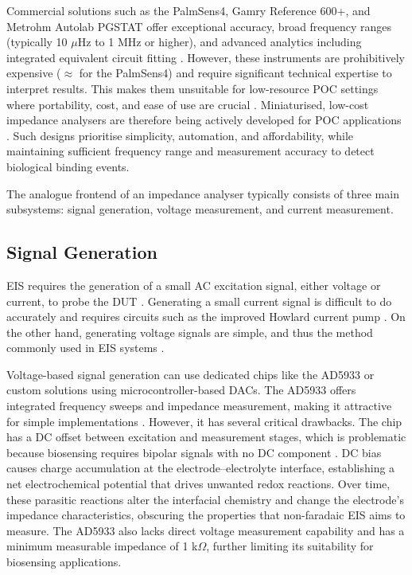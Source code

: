 Commercial solutions such as the PalmSens4, Gamry Reference 600+, and Metrohm Autolab PGSTAT offer exceptional accuracy, broad frequency ranges (typically 10 $\mu$Hz to 1 MHz or higher), and advanced analytics including integrated equivalent circuit fitting \cite{PalmSens4}. However, these instruments are prohibitively expensive ($\approx$  for the PalmSens4) and require significant technical expertise to interpret results. This makes them unsuitable for low-resource \ac{POC} settings where portability, cost, and ease of use are crucial \cite{pariharPointofcareBiosensorsInfectious}. Miniaturised, low-cost impedance analysers are therefore being actively developed for POC applications \cite{buscagliaSimpleZLowCostPortable2023, al-aliDesignPortableLowCost2017, ibrahimCMOSTransimpedanceAmplifier, pariharPointofcareBiosensorsInfectious}. Such designs prioritise simplicity, automation, and affordability, while maintaining sufficient frequency range and measurement accuracy to detect biological binding events.

The analogue frontend of an impedance analyser typically consists of three main subsystems: signal generation, voltage measurement, and current measurement.
\subsection{Signal Generation}\label{subsec:lit_review_excitation}
\Ac{EIS} requires the generation of a small AC excitation signal, either voltage or current, to probe the \ac{DUT} \cite{orazemTutorialElectrochemicalImpedance2020}. Generating a small current signal is difficult to do accurately and requires circuits such as the improved Howlard current pump \cite{ImprovedHowlandCurrent2020}. On the other hand, generating voltage signals are simple, and thus the method commonly used in \ac{EIS} systems \cite{orazemTutorialElectrochemicalImpedance2020}.

Voltage-based signal generation can use dedicated chips like the AD5933 or custom solutions using microcontroller-based \acp{DAC}. The AD5933 offers integrated frequency sweeps and impedance measurement, making it attractive for simple implementations \cite{AD5934TestUpdate}. However, it has several critical drawbacks. The chip has a DC offset between excitation and measurement stages, which is problematic because biosensing requires bipolar signals with no DC component \cite{seoaneAnalogFrontendEnables2008}. DC bias causes charge accumulation at the electrode–electrolyte interface, establishing a net electrochemical potential that drives unwanted redox reactions. Over time, these parasitic reactions alter the interfacial chemistry and change the electrode's impedance characteristics, obscuring the properties that non-faradaic \ac{EIS} aims to measure. The AD5933 also lacks direct voltage measurement capability and has a minimum measurable impedance of 1 k$\Omega$, further limiting its suitability for biosensing applications.


